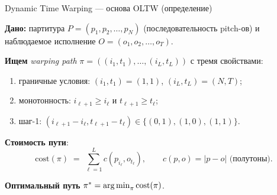 \begin{frame}{Dynamic Time Warping --- основа OLTW (определение)}

\textbf{Дано:} партитура $P = (p_1, p_2, \ldots, p_N)$ (последовательность
pitch-ов) и наблюдаемое исполнение $O = (o_1, o_2, \ldots, o_T)$.

\bigskip

\textbf{Ищем} \emph{warping path} $\pi = ((i_1, t_1), \ldots, (i_L, t_L))$
с тремя свойствами:

\begin{enumerate}
\item граничные условия: $(i_1, t_1) = (1, 1)$, $(i_L, t_L) = (N, T)$;
\item монотонность: $i_{\ell+1} \ge i_\ell$ и $t_{\ell+1} \ge t_\ell$;
\item шаг-1: $(i_{\ell+1} - i_\ell, t_{\ell+1} - t_\ell) \in \{(0,1),(1,0),(1,1)\}$.
\end{enumerate}

\bigskip

\textbf{Стоимость пути}:
\[
\mathrm{cost}(\pi) \;=\; \sum_{\ell=1}^{L} c(p_{i_\ell}, o_{t_\ell}),
\qquad
c(p, o) = |p - o| \text{ (полутоны)}.
\]

\bigskip

\textbf{Оптимальный путь} $\pi^* = \operatorname*{arg\,min}_{\pi} \mathrm{cost}(\pi)$.

\end{frame}

